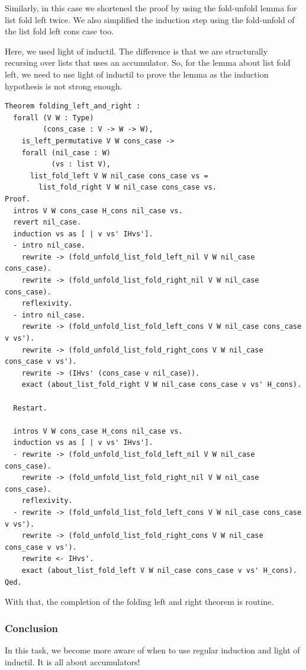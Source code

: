 \documentclass{article}
\begin{document}
Similarly, in this case we shortened the proof by using the fold-unfold lemma for list fold left twice. We also simplified the induction step using the fold-unfold of the list fold left cons case too.

Here, we used light of inductil. The difference is that we are structurally recursing over lists that uses an accumulator. So, for the lemma about list fold left, we need to use light of inductil to prove the lemma as the induction hypothesis is not strong enough.

\begin{lstlisting}
Theorem folding_left_and_right :
  forall (V W : Type)
         (cons_case : V -> W -> W),
    is_left_permutative V W cons_case ->
    forall (nil_case : W)
           (vs : list V),
      list_fold_left V W nil_case cons_case vs =
        list_fold_right V W nil_case cons_case vs.
Proof.
  intros V W cons_case H_cons nil_case vs.
  revert nil_case.
  induction vs as [ | v vs' IHvs'].
  - intro nil_case.
    rewrite -> (fold_unfold_list_fold_left_nil V W nil_case cons_case).
    rewrite -> (fold_unfold_list_fold_right_nil V W nil_case cons_case).
    reflexivity.
  - intro nil_case.
    rewrite -> (fold_unfold_list_fold_left_cons V W nil_case cons_case v vs').
    rewrite -> (fold_unfold_list_fold_right_cons V W nil_case cons_case v vs').
    rewrite -> (IHvs' (cons_case v nil_case)).
    exact (about_list_fold_right V W nil_case cons_case v vs' H_cons).

  Restart.

  intros V W cons_case H_cons nil_case vs.
  induction vs as [ | v vs' IHvs'].
  - rewrite -> (fold_unfold_list_fold_left_nil V W nil_case cons_case).
    rewrite -> (fold_unfold_list_fold_right_nil V W nil_case cons_case).
    reflexivity.
  - rewrite -> (fold_unfold_list_fold_left_cons V W nil_case cons_case v vs').
    rewrite -> (fold_unfold_list_fold_right_cons V W nil_case cons_case v vs').
    rewrite <- IHvs'.
    exact (about_list_fold_left V W nil_case cons_case v vs' H_cons).
Qed.
\end{lstlisting}

With that, the completion of the folding left and right theorem is routine. 

\subsubsection{Conclusion}
In this task, we become more aware of when to use regular induction and light of inductil. It is all about accumulators! 
\end{document}
